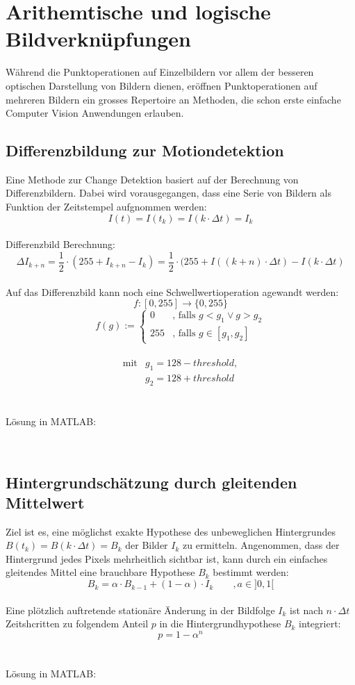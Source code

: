 \section{Arithemtische und logische Bildverknüpfungen}
Während die Punktoperationen auf Einzelbildern vor allem der besseren optischen Darstellung von 
Bildern dienen, eröffnen Punktoperationen auf mehreren Bildern ein grosses Repertoire an Methoden, 
die schon erste einfache Computer Vision Anwendungen erlauben.

\subsection{Differenzbildung zur Motiondetektion}
Eine Methode zur Change Detektion basiert auf der Berechnung von Differenzbildern. Dabei wird vorausgegangen, dass eine Serie von Bildern als Funktion der Zeitstempel aufgnommen werden:
\[
	I(t) = I(t_k) = I(k\cdot \Delta t) = I_k
\]\\
Differenzbild Berechnung:
\[
	\Delta I_{k+n}=\frac{1}{2} \cdot (255 + I_{k+n}-I_k) = \frac{1}{2} \cdot (255 + I((k+n)\cdot \Delta t)-I(k\cdot \Delta t)
\]\\
Auf das Differenzbild kann noch eine Schwellwertioperation agewandt werden:
\[
	f:[0,255] \rightarrow \lbrace 0,255 \rbrace
\]
\[
	f(g) := \left\lbrace 
	\begin{matrix}
		0 & \text{, falls } g < g_1 \vee g > g_2\\
		255 & \text{, falls } g \in [g_1,g_2]
	\end{matrix}
	\right.
\]\\
\[
	\begin{matrix}
		\text{mit} & g_1 = 128 - threshold,\\
				   & g_2 = 128 + threshold
	\end{matrix}
\]\\\\
Lösung in MATLAB:
\lstset{language=Matlab}

~\\

\subsection{Hintergrundschätzung durch gleitenden Mittelwert}
Ziel ist es, eine möglichst exakte Hypothese des unbeweglichen Hintergrundes $B(t_k) = B(k \cdot \Delta t) = B_k$ der Bilder $I_k$ zu ermitteln. Angenommen, dass der Hintergrund jedes Pixels mehrheitlich sichtbar ist, kann durch ein einfaches gleitendes Mittel eine brauchbare Hypothese $B_k$ bestimmt werden:
\[
	B_k = \alpha \cdot B_{k-1} + (1- \alpha)  \cdot I_k \qquad , a \in ]0,1[ 
\]\\
Eine plötzlich auftretende stationäre Änderung in der Bildfolge $I_k$ ist nach $n \cdot \Delta t$ Zeitshcritten zu folgendem Anteil $p$ in die Hintergrundhypothese $B_k$ integriert:
\[
	p = 1 - \alpha^n
\]\\\\
Lösung in MATLAB:
\lstset{language=Matlab}

~\\

